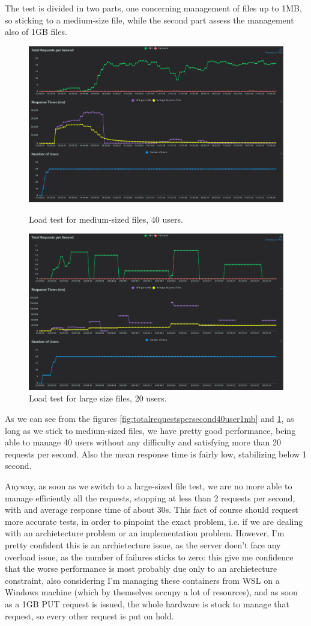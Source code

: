 \documentclass{article}
\begin{document}
	The test is divided in two parts, one concerning management of files up to 1MB, so sticking to a medium-size file, while the second part assess the management also of 1GB files.
	
	\begin{figure}[h]
		\centering
		\includegraphics[width=0.7\linewidth]{total_requests_per_second_40user1mb}
		\caption{Load test for medium-sized files, 40 users.}
		\label{fig:totalrequestspersecond40user1mb}
		\includegraphics[width=0.7\linewidth]{response_times_(ms)_20users_1gb}
		\caption{Load test for large size files, 20 users.}
		\label{fig:responsetimesms20users1gb}
	\end{figure}
	
	As we can see from the figures \ref{fig:totalrequestspersecond40user1mb} and \ref{fig:responsetimesms20users1gb}, as long as we stick to medium-sized files, we have pretty good performance, being able to manage 40 users without any difficulty and satisfying more than 20 requests per second. Also the mean response time is fairly low, stabilizing below 1 second.
	
	Anyway, as soon as we switch to a large-sized file test, we are no more able to manage efficiently all the requests, stopping at less than 2 requests per second, with and average response time of about 30s. This fact of course should request more accurate tests, in order to pinpoint the exact problem, i.e. if we are dealing with an archietecture problem or an implementation problem. However, I'm pretty confident this is an archietecture issue, as the server doen't face any overload issue, as the number of failures sticks to zero: this give me confidence that the worse performance is most probably due only to an archietecture constraint, also considering I'm managing these containers from WSL on a Windows machine (which by themselves occupy a lot of resources), and as soon as a 1GB PUT request is issued, the whole hardware is stuck to manage that request, so every other request is put on hold.
	
\end{document}
